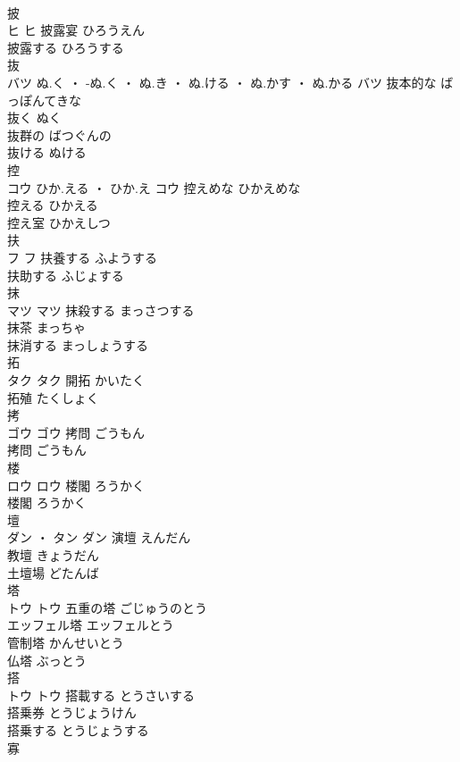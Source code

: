 \documentclass[8pt]{extreport}
\begin{document}
\begin{CJK}{UTF8}{min}
\\	披	
\\	ヒ		ヒ	披露宴	ひろうえん	
\\	披露する	ひろうする	
\\	抜	
\\	バツ	ぬ.く ・ -ぬ.く ・ ぬ.き ・ ぬ.ける ・ ぬ.かす ・ ぬ.かる	バツ	抜本的な	ばっぽんてきな	
\\	抜く	ぬく	
\\	抜群の	ばつぐんの	
\\	抜ける	ぬける	
\\	控	
\\	コウ	ひか.える ・ ひか.え	コウ	控えめな	ひかえめな	
\\	控える	ひかえる	
\\	控え室	ひかえしつ	
\\	扶	
\\	フ		フ	扶養する	ふようする	
\\	扶助する	ふじょする	
\\	抹	
\\	マツ		マツ	抹殺する	まっさつする	
\\	抹茶	まっちゃ	
\\	抹消する	まっしょうする	
\\	拓	
\\	タク		タク	開拓	かいたく	
\\	拓殖	たくしょく	
\\	拷	
\\	ゴウ		ゴウ	拷問	ごうもん	
\\	拷問	ごうもん	
\\	楼	
\\	ロウ		ロウ	楼閣	ろうかく	
\\	楼閣	ろうかく	
\\	壇	
\\	ダン ・ タン		ダン	演壇	えんだん	
\\	教壇	きょうだん	
\\	土壇場	どたんば	
\\	塔	
\\	トウ		トウ	五重の塔	ごじゅうのとう	
\\	エッフェル塔	エッフェルとう	
\\	管制塔	かんせいとう	
\\	仏塔	ぶっとう	
\\	搭	
\\	トウ		トウ	搭載する	とうさいする	
\\	搭乗券	とうじょうけん	
\\	搭乗する	とうじょうする	
\\	寡	

\end{CJK}
\end{document}
